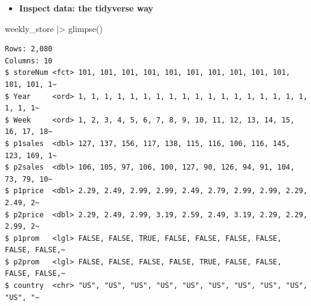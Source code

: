 \documentclass[
  ignorenonframetext,
]{beamer}
\newenvironment{Shaded}{\begin{snugshade}}{\end{snugshade}}
\newcommand{\FunctionTok}[1]{\textcolor[rgb]{0.28,0.35,0.67}{#1}}
\newcommand{\NormalTok}[1]{\textcolor[rgb]{0.00,0.23,0.31}{#1}}
\newcommand{\SpecialCharTok}[1]{\textcolor[rgb]{0.37,0.37,0.37}{#1}}
\providecommand{\tightlist}{%
  \setlength{\itemsep}{0pt}\setlength{\parskip}{0pt}}\usepackage{longtable,booktabs,array}
\begin{document}
\begin{frame}[fragile]{}
\label{section-6}
\begin{itemize}
\tightlist
\item
  \textbf{Inspect data: the tidyverse way}
\end{itemize}

\tiny

\begin{Shaded}
\begin{Highlighting}[]
\NormalTok{weekly\_store }\SpecialCharTok{|\textgreater{}} \FunctionTok{glimpse}\NormalTok{()}
\end{Highlighting}
\end{Shaded}

\begin{verbatim}
Rows: 2,080
Columns: 10
$ storeNum <fct> 101, 101, 101, 101, 101, 101, 101, 101, 101, 101, 101, 101, 1~
$ Year     <ord> 1, 1, 1, 1, 1, 1, 1, 1, 1, 1, 1, 1, 1, 1, 1, 1, 1, 1, 1, 1, 1~
$ Week     <ord> 1, 2, 3, 4, 5, 6, 7, 8, 9, 10, 11, 12, 13, 14, 15, 16, 17, 18~
$ p1sales  <dbl> 127, 137, 156, 117, 138, 115, 116, 106, 116, 145, 123, 169, 1~
$ p2sales  <dbl> 106, 105, 97, 106, 100, 127, 90, 126, 94, 91, 104, 73, 79, 10~
$ p1price  <dbl> 2.29, 2.49, 2.99, 2.99, 2.49, 2.79, 2.99, 2.99, 2.29, 2.49, 2~
$ p2price  <dbl> 2.29, 2.49, 2.99, 3.19, 2.59, 2.49, 3.19, 2.29, 2.29, 2.99, 2~
$ p1prom   <lgl> FALSE, FALSE, TRUE, FALSE, FALSE, FALSE, FALSE, FALSE, FALSE,~
$ p2prom   <lgl> FALSE, FALSE, FALSE, FALSE, TRUE, FALSE, FALSE, FALSE, FALSE,~
$ country  <chr> "US", "US", "US", "US", "US", "US", "US", "US", "US", "US", "~
\end{verbatim}
\end{frame}
\end{document}
